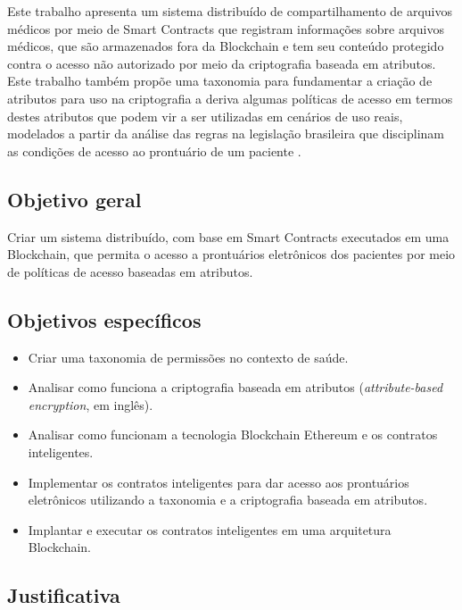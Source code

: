 \documentclass[a4paper,11pt]{article}
\begin{document}
Este trabalho apresenta um sistema distribuído de compartilhamento de arquivos médicos por meio de Smart Contracts que registram informações sobre arquivos médicos, que são armazenados fora da Blockchain e tem seu conteúdo protegido contra o acesso não autorizado por meio da criptografia baseada em atributos.
Este trabalho também propõe uma taxonomia para fundamentar a criação de atributos para uso na criptografia a deriva algumas políticas de acesso em termos destes atributos que podem vir a ser utilizadas em cenários de uso reais, modelados a partir da análise das regras na legislação
brasileira que disciplinam as condições de acesso ao prontuário de um paciente .

\subsection{Objetivo geral}

Criar um sistema distribuído, com base em Smart Contracts executados em uma Blockchain, que permita o acesso a prontuários eletrônicos dos pacientes por meio de políticas de acesso baseadas em atributos.

\subsection{Objetivos específicos}

\begin{itemize}

\item Criar uma taxonomia de permissões no contexto de saúde.

\item Analisar como funciona a criptografia baseada em atributos (\textit{attribute-based encryption}, em inglês).

\item Analisar como funcionam a tecnologia Blockchain Ethereum e os contratos inteligentes.

\item Implementar os contratos inteligentes para dar acesso aos prontuários eletrônicos utilizando a taxonomia e a criptografia baseada em atributos.

\item Implantar e executar os contratos inteligentes em uma arquitetura Blockchain.

\end{itemize}

\subsection{Justificativa}
\end{document}
